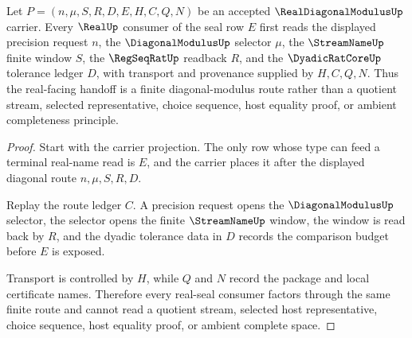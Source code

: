 \begin{theorem}
\label{thm:real-diagonal-modulus-real-seal-route}
Let $P=(n,\mu,S,R,D,E,H,C,Q,N)$ be an accepted $\RealDiagonalModulusUp$ carrier. Every $\RealUp$ consumer of the seal row $E$ first reads the displayed precision request $n$, the $\DiagonalModulusUp$ selector $\mu$, the $\StreamNameUp$ finite window $S$, the $\RegSeqRatUp$ readback $R$, and the $\DyadicRatCoreUp$ tolerance ledger $D$, with transport and provenance supplied by $H,C,Q,N$. Thus the real-facing handoff is a finite diagonal-modulus route rather than a quotient stream, selected representative, choice sequence, host equality proof, or ambient completeness principle.
\end{theorem}
\begin{proof}
Start with the carrier projection. The only row whose type can feed a terminal real-name read is $E$, and the carrier places it after the displayed diagonal route $n,\mu,S,R,D$.

Replay the route ledger $C$. A precision request opens the $\DiagonalModulusUp$ selector, the selector opens the finite $\StreamNameUp$ window, the window is read back by $R$, and the dyadic tolerance data in $D$ records the comparison budget before $E$ is exposed.

Transport is controlled by $H$, while $Q$ and $N$ record the package and local certificate names. Therefore every real-seal consumer factors through the same finite route and cannot read a quotient stream, selected host representative, choice sequence, host equality proof, or ambient complete space.
\end{proof}

\begin{closurestatus}{\RealDiagonalModulusUp}
  \theoryclosure{\seedClosure}
  \formalstatus{\unformalizedV}
\end{closurestatus}
